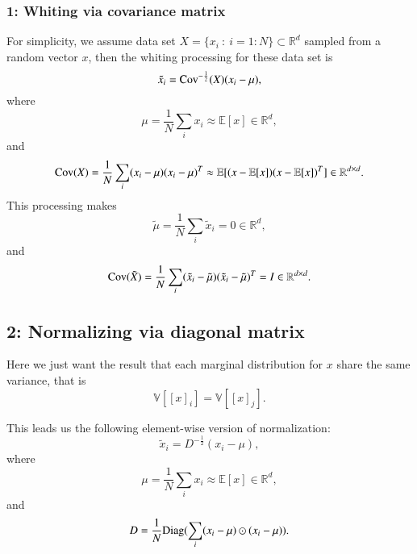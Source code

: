 \subsubsection{1: Whiting via covariance matrix}
For simplicity, we assume data set $ X = \{ x_i~:~ i = 1:N\} \subset \mathbb{R}^d$ 
sampled from a random vector $x$, then the whiting processing for these data set is
\begin{equation}\label{key}
\tilde x_i = {\rm Cov}^{-\frac{1}{2}}(X)(x_i - \mu),
\end{equation}
where
\begin{equation}\label{key}
\mu = \frac{1}{N} \sum_{i} x_i \approx \mathbb{E}[x] \in \mathbb{R}^d,
\end{equation}
and
\begin{equation}\label{key}
{\rm Cov}(X) = \frac{1}{N} \sum_{i} (x_i - \mu) (x_i - \mu)^T \approx \mathbb{E}[(x-\mathbb{E}[x])(x-\mathbb{E}[x])^T]\in \mathbb{R}^{d\times d}.
\end{equation}
This processing makes
\begin{equation}\label{key}
\tilde \mu = \frac{1}{N} \sum_{i} \tilde x_i = 0 \in \mathbb{R}^d,
\end{equation}
and 
\begin{equation}\label{key}
{\rm Cov}(\tilde X) = \frac{1}{N} \sum_{i} (\tilde x_i - \tilde \mu) (\tilde x_i - \tilde \mu)^T = I \in \mathbb{R}^{d\times d}.
\end{equation}

\subsection{2: Normalizing via diagonal matrix}
Here we just want the result that each marginal distribution for $x$ share the same variance, that
is 
\begin{equation}\label{key}
\mathbb{V}[[x]_i] = \mathbb{V}[[x]_j].
\end{equation}

This leads us the following element-wise version of normalization:
\begin{equation}\label{norm-D}
\tilde x_i = D^{-\frac{1}{2}}{(x_i - \mu)},
\end{equation}
where
\begin{equation}\label{key}
\mu = \frac{1}{N} \sum_{i} x_i \approx \mathbb{E}[x] \in \mathbb{R}^d,
\end{equation}
and
\begin{equation}\label{key}
D = \frac{1}{N} {\rm Diag}(\sum_{i} (x_i - \mu) \odot (x_i - \mu) ).
\end{equation}

